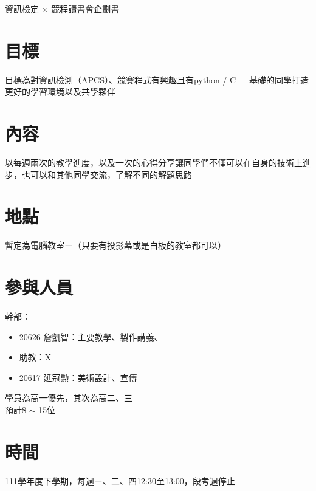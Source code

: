 \documentclass[12pt]{article}
\begin{document}
    \begin{Huge}
        \noindent
        資訊檢定 × 競程讀書會企劃書
    \end{Huge}

    \section{目標}
    目標為對資訊檢測（APCS）、競賽程式有興趣且有python / C++基礎的同學打造更好的學習環境以及共學夥伴

    \section{內容}
    以每週兩次的教學進度，以及一次的心得分享讓同學們不僅可以在自身的技術上進步，也可以和其他同學交流，了解不同的解題思路

    \section{地點}
    暫定為電腦教室ㄧ（只要有投影幕或是白板的教室都可以）

    \section{參與人員}
    幹部：
    \begin{itemize}
        \item 20626 詹凱智：主要教學、製作講義、
        \item 助教：X
        \item 20617 延冠勲：美術設計、宣傳
    \end{itemize}

    \noindent
    學員為高一優先，其次為高二、三\\
    預計8 $\sim$ 15位

    \section{時間}
    111學年度下學期，每週ㄧ、二、四12:30至13:00，段考週停止

    \pagebreak
\end{document}
